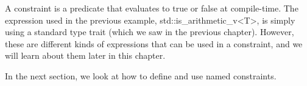 A constraint is a predicate that evaluates to true or false at compile-time. The expression used in the previous example, std::is\_arithmetic\_v<T>, is simply using a standard type trait (which we saw in the previous chapter). However, these are different kinds of expressions that can be used in a constraint, and we will learn about them later in this chapter.

In the next section, we look at how to define and use named constraints.

























